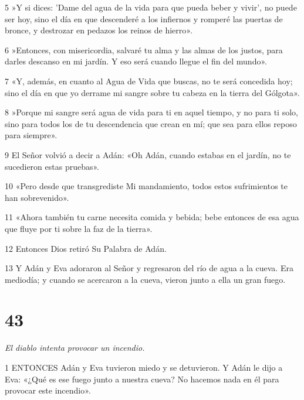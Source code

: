 \par 5 »Y si dices: 'Dame del agua de la vida para que pueda beber y vivir', no puede ser hoy, sino el día en que descenderé a los infiernos y romperé las puertas de bronce, y destrozar en pedazos los reinos de hierro».

\par 6 »Entonces, con misericordia, salvaré tu alma y las almas de los justos, para darles descanso en mi jardín. Y eso será cuando llegue el fin del mundo».

\par 7 «Y, además, en cuanto al Agua de Vida que buscas, no te será concedida hoy; sino el día en que yo derrame mi sangre sobre tu cabeza en la tierra del Gólgota».

\par 8 »Porque mi sangre será agua de vida para ti en aquel tiempo, y no para ti solo, sino para todos los de tu descendencia que crean en mí; que sea para ellos reposo para siempre».

\par 9 El Señor volvió a decir a Adán: «Oh Adán, cuando estabas en el jardín, no te sucedieron estas pruebas».

\par 10 «Pero desde que transgrediste Mi mandamiento, todos estos sufrimientos te han sobrevenido».

\par 11 «Ahora también tu carne necesita comida y bebida; bebe entonces de esa agua que fluye por ti sobre la faz de la tierra».

\par 12 Entonces Dios retiró Su Palabra de Adán.

\par 13 Y Adán y Eva adoraron al Señor y regresaron del río de agua a la cueva. Era mediodía; y cuando se acercaron a la cueva, vieron junto a ella un gran fuego.

\chapter{43}

\par \textit{El diablo intenta provocar un incendio.}

\par 1 ENTONCES Adán y Eva tuvieron miedo y se detuvieron. Y Adán le dijo a Eva: «¿Qué es ese fuego junto a nuestra cueva? No hacemos nada en él para provocar este incendio».

